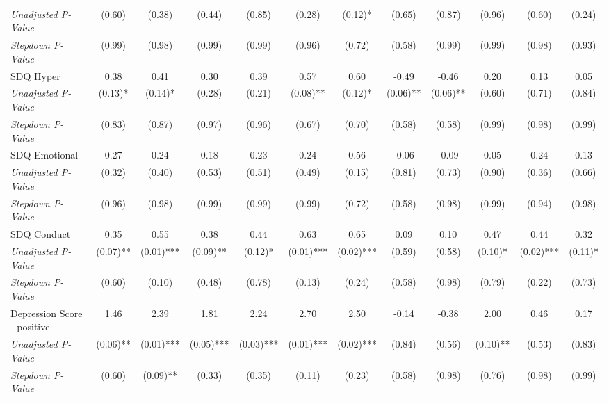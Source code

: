 \begin{tabular}{l c c c c c c c c c c c}
\quad \textit{Unadjusted P-Value} & (0.60) & (0.38) & (0.44) & (0.85) & (0.28) & (0.12)* & (0.65) & (0.87) & (0.96) & (0.60) & (0.24) \\
\quad \textit{Stepdown P-Value} & (0.99) & (0.98) & (0.99) & (0.99) & (0.96) & (0.72) & (0.58) & (0.99) & (0.99) & (0.98) & (0.93) \\
SDQ Hyper & 0.38 & 0.41 & 0.30 & 0.39 & 0.57 & 0.60 & -0.49 & -0.46 & 0.20 & 0.13 & 0.05 \\
\quad \textit{Unadjusted P-Value} & (0.13)* & (0.14)* & (0.28) & (0.21) & (0.08)** & (0.12)* & (0.06)** & (0.06)** & (0.60) & (0.71) & (0.84) \\
\quad \textit{Stepdown P-Value} & (0.83) & (0.87) & (0.97) & (0.96) & (0.67) & (0.70) & (0.58) & (0.58) & (0.99) & (0.98) & (0.99) \\
SDQ Emotional & 0.27 & 0.24 & 0.18 & 0.23 & 0.24 & 0.56 & -0.06 & -0.09 & 0.05 & 0.24 & 0.13 \\
\quad \textit{Unadjusted P-Value} & (0.32) & (0.40) & (0.53) & (0.51) & (0.49) & (0.15) & (0.81) & (0.73) & (0.90) & (0.36) & (0.66) \\
\quad \textit{Stepdown P-Value} & (0.96) & (0.98) & (0.99) & (0.99) & (0.99) & (0.72) & (0.58) & (0.98) & (0.99) & (0.94) & (0.98) \\
SDQ Conduct & 0.35 & 0.55 & 0.38 & 0.44 & 0.63 & 0.65 & 0.09 & 0.10 & 0.47 & 0.44 & 0.32 \\
\quad \textit{Unadjusted P-Value} & (0.07)** & (0.01)*** & (0.09)** & (0.12)* & (0.01)*** & (0.02)*** & (0.59) & (0.58) & (0.10)* & (0.02)*** & (0.11)* \\
\quad \textit{Stepdown P-Value} & (0.60) & (0.10) & (0.48) & (0.78) & (0.13) & (0.24) & (0.58) & (0.98) & (0.79) & (0.22) & (0.73) \\
Depression Score - positive & 1.46 & 2.39 & 1.81 & 2.24 & 2.70 & 2.50 & -0.14 & -0.38 & 2.00 & 0.46 & 0.17 \\
\quad \textit{Unadjusted P-Value} & (0.06)** & (0.01)*** & (0.05)*** & (0.03)*** & (0.01)*** & (0.02)*** & (0.84) & (0.56) & (0.10)** & (0.53) & (0.83) \\
\quad \textit{Stepdown P-Value} & (0.60) & (0.09)** & (0.33) & (0.35) & (0.11) & (0.23) & (0.58) & (0.98) & (0.76) & (0.98) & (0.99) \\
\bottomrule
\end{tabular}
